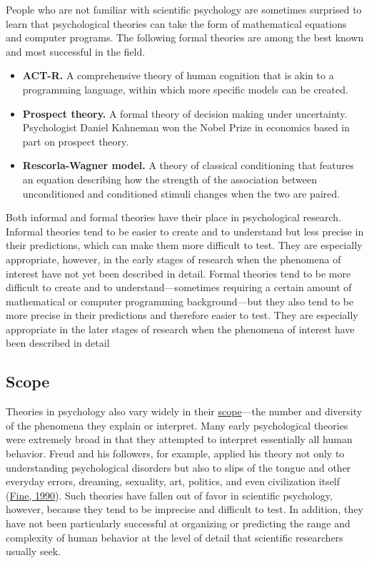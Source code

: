 \documentclass[
]{krantz}
\providecommand{\tightlist}{%
  \setlength{\itemsep}{0pt}\setlength{\parskip}{0pt}}
\begin{document}
People who are not familiar with scientific psychology are sometimes surprised to learn that psychological theories can take the form of mathematical equations and computer programs. The following formal theories are among the best known and most successful in the field.

\begin{itemize}
\tightlist
\item
  \textbf{ACT-R.} A comprehensive theory of human cognition that is akin to a programming language, within which more specific models can be created.
\item
  \textbf{Prospect theory.} A formal theory of decision making under uncertainty. Psychologist Daniel Kahneman won the Nobel Prize in economics based in part on prospect theory.
\item
  \textbf{Rescorla-Wagner model.} A theory of classical conditioning that features an equation describing how the strength of the association between unconditioned and conditioned stimuli changes when the two are paired.
\end{itemize}

Both informal and formal theories have their place in psychological research. Informal theories tend to be easier to create and to understand but less precise in their predictions, which can make them more difficult to test. They are especially appropriate, however, in the early stages of research when the phenomena of interest have not yet been described in detail. Formal theories tend to be more difficult to create and to understand---sometimes requiring a certain amount of mathematical or computer programming background---but they also tend to be more precise in their predictions and therefore easier to test. They are especially appropriate in the later stages of research when the phenomena of interest have been described in detail

\hypertarget{scope}{%
\subsection*{Scope}\label{scope}}


Theories in psychology also vary widely in their \protect\hyperlink{scope-1}{scope}---the number and diversity of the phenomena they explain or interpret. Many early psychological theories were extremely broad in that they attempted to interpret essentially all human behavior. Freud and his followers, for example, applied his theory not only to understanding psychological disorders but also to slips of the tongue and other everyday errors, dreaming, sexuality, art, politics, and even civilization itself (\protect\hyperlink{ref-fine1990history}{Fine, 1990}). Such theories have fallen out of favor in scientific psychology, however, because they tend to be imprecise and difficult to test. In addition, they have not been particularly successful at organizing or predicting the range and complexity of human behavior at the level of detail that scientific researchers usually seek.
\end{document}
